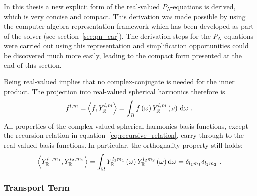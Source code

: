 In this thesis a new explicit form of the real-valued $P_N$-equations is derived, which is very concise and compact. This derivation was made possible by using the computer algebra representation framework which has been developed as part of the solver (see section~\ref{sec:pn_car}). The derivation steps for the $P_N$-equations were carried out using this representation and simplification opportunities could be discovered much more easily, leading to the compact form presented at the end of this section.

Being real-valued implies that no complex-conjugate is needed for the inner product. The projection into real-valued spherical harmonics therefore is
\begin{align}
\label{eq:sh_projection}
f^{l, m} = \left<f,Y_{\mathbb{R}}^{l, m}\right> = 
\int_\Omega f\left(\omega\right)Y_{\mathbb{R}}^{l,m}\left(\omega\right)\,\mathrm{d}\omega
\ .
\end{align}
All properties of the complex-valued spherical harmonics basis functions, except the recursion relation in equation~\ref{eq:recursive_relation}, carry through to the real-valued basis functions. In particular, the orthognality property still holds:
\begin{align}
\label{eq:sh_orthogonality_real}
\left<Y_{\mathbb{R}}^{l_1, m_1},Y_{\mathbb{R}}^{l_2, m_2}\right>=
\int_{\Omega} Y_{\mathbb{R}}^{l_1m_1}\left(\omega\right) Y_{\mathbb{R}}^{l_2m_2}\left(\omega\right) \mathbf{d}\omega = \delta_{l_1m_1}\delta_{l_2m_2}
\ .
\end{align}

\subsubsection*{Transport Term}

